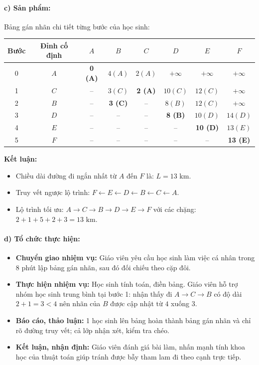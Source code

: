 \documentclass[12pt, a4paper]{article}
\begin{document}
\paragraph{c) Sản phẩm:} Bảng gán nhãn chi tiết từng bước của học sinh:
\begin{center}
\small
\begin{tabular}{|c|c|c|c|c|c|c|c|}
\hline
\textbf{Bước} & \textbf{Đỉnh cố định} & $A$ & $B$ & $C$ & $D$ & $E$ & $F$ \\ \hline
0 & $A$ & \textbf{0 (A)} & $4 (A)$ & $2 (A)$ & $+\infty$ & $+\infty$ & $+\infty$ \\ \hline
1 & $C$ & -- & $3 (C)$ & \textbf{2 (A)} & $10 (C)$ & $12 (C)$ & $+\infty$ \\ \hline
2 & $B$ & -- & \textbf{3 (C)} & -- & $8 (B)$ & $12 (C)$ & $+\infty$ \\ \hline
3 & $D$ & -- & -- & -- & \textbf{8 (B)} & $10 (D)$ & $14 (D)$ \\ \hline
4 & $E$ & -- & -- & -- & -- & \textbf{10 (D)} & $13 (E)$ \\ \hline
5 & $F$ & -- & -- & -- & -- & -- & \textbf{13 (E)} \\ \hline
\end{tabular}
\end{center}
\textbf{Kết luận:}
\begin{itemize}[leftmargin=0.6cm]
    \item Chiều dài đường đi ngắn nhất từ $A$ đến $F$ là: $L = 13\text{ km}$.
    \item Truy vết ngược lộ trình: $F \leftarrow E \leftarrow D \leftarrow B \leftarrow C \leftarrow A$.
    \item Lộ trình tối ưu: $A \to C \to B \to D \to E \to F$ với các chặng: $2 + 1 + 5 + 2 + 3 = 13\text{ km}$.
\end{itemize}

\paragraph{d) Tổ chức thực hiện:}
\begin{itemize}[leftmargin=0.8cm]
    \item \textbf{Chuyển giao nhiệm vụ:} Giáo viên yêu cầu học sinh làm việc cá nhân trong 8 phút lập bảng gán nhãn, sau đó đối chiếu theo cặp đôi.
    \item \textbf{Thực hiện nhiệm vụ:} Học sinh tính toán, điền bảng. Giáo viên hỗ trợ nhóm học sinh trung bình tại bước 1: nhận thấy đi $A \to C \to B$ có độ dài $2 + 1 = 3 < 4$ nên nhãn của $B$ được cập nhật từ $4$ xuống $3$.
    \item \textbf{Báo cáo, thảo luận:} 1 học sinh lên bảng hoàn thành bảng gán nhãn và chỉ rõ đường truy vết; cả lớp nhận xét, kiểm tra chéo.
    \item \textbf{Kết luận, nhận định:} Giáo viên đánh giá bài làm, nhấn mạnh tính khoa học của thuật toán giúp tránh được bẫy tham lam đi theo cạnh trực tiếp.
\end{itemize}
\end{document}
